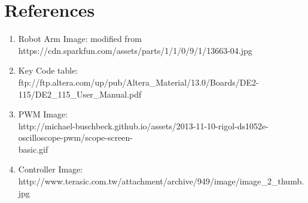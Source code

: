 \documentclass{article}
\begin{document}
\section{References}
\begin{enumerate}
    \item Robot Arm Image: modified from https://cdn.sparkfun.com/assets/parts/1/1/0/9/1/13663-04.jpg\\\hspace*{\fill}
    \item Key Code table: \\ 
    ftp://ftp.altera.com/up/pub/Altera\_Material/13.0/Boards/DE2-115/DE2\_115\_User\_Manual.pdf\\
    \item PWM Image: \\
    http://michael-buschbeck.github.io/assets/2013-11-10-rigol-ds1052e-oscilloscope-pwm/scope-screen-\\basic.gif \\
    \item Controller Image: http://www.terasic.com.tw/attachment/archive/949/image/image\_2\_thumb.jpg
\end{enumerate}
\end{document}
